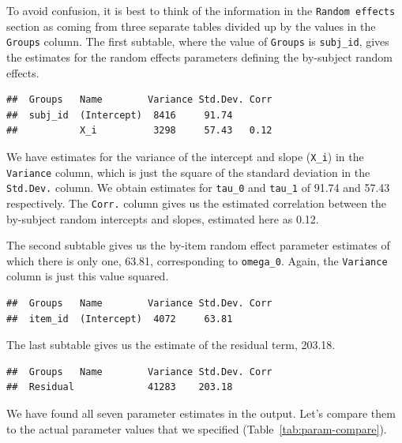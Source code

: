 \documentclass[
  english,
  doc,floatsintext]{apa6}
\begin{document}
To avoid confusion, it is best to think of the information in the \texttt{Random\ effects} section as coming from three separate tables divided up by the values in the \texttt{Groups} column. The first subtable, where the value of \texttt{Groups} is \texttt{subj\_id}, gives the estimates for the random effects parameters defining the by-subject random effects.

\begin{verbatim}
##  Groups   Name        Variance Std.Dev. Corr
##  subj_id  (Intercept)  8416     91.74       
##           X_i          3298     57.43   0.12
\end{verbatim}

\noindent We have estimates for the variance of the intercept and slope (\texttt{X\_i}) in the \texttt{Variance} column, which is just the square of the standard deviation in the \texttt{Std.Dev.} column. We obtain estimates for \texttt{tau\_0} and \texttt{tau\_1} of 91.74 and 57.43 respectively. The \texttt{Corr.} column gives us the estimated correlation between the by-subject random intercepts and slopes, estimated here as 0.12.

The second subtable gives us the by-item random effect parameter estimates of which there is only one, 63.81, corresponding to \texttt{omega\_0}. Again, the \texttt{Variance} column is just this value squared.

\begin{verbatim}
##  Groups   Name        Variance Std.Dev. Corr
##  item_id  (Intercept)  4072     63.81
\end{verbatim}

The last subtable gives us the estimate of the residual term, 203.18.

\begin{verbatim}
##  Groups   Name        Variance Std.Dev. Corr
##  Residual             41283    203.18
\end{verbatim}

We have found all seven parameter estimates in the output. Let's compare them to the actual parameter values that we specified (Table~\ref{tab:param-compare}).
\end{document}

